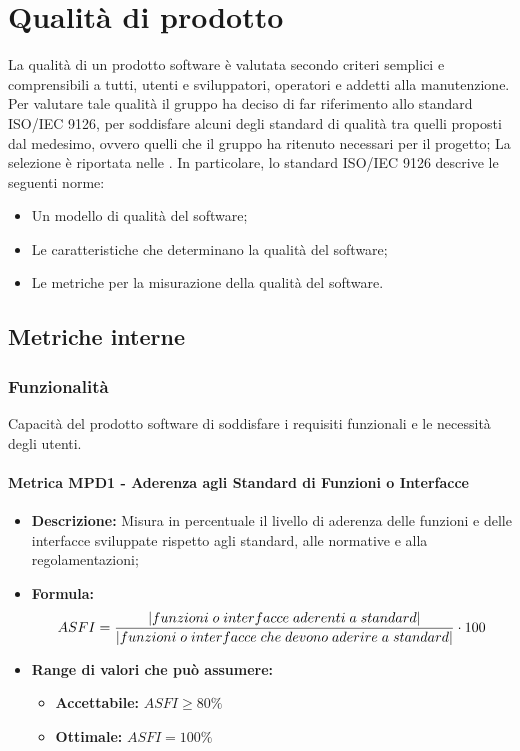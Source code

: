 \section{Qualità di prodotto}
La qualità di un prodotto software è valutata secondo criteri semplici e comprensibili a tutti, utenti e sviluppatori, operatori e addetti alla manutenzione.
Per valutare tale qualità il gruppo \Gruppo{} ha deciso di far riferimento allo standard ISO/IEC 9126, per soddisfare alcuni degli standard di qualità tra quelli proposti dal medesimo, ovvero quelli che il gruppo ha ritenuto necessari per il progetto; La selezione è riportata nelle \NdP{}. In particolare, lo standard ISO/IEC 9126 descrive le seguenti norme:
\begin{itemize}
    \item Un modello di qualità del software; 
    \item Le caratteristiche che determinano la qualità del software;
    \item Le metriche per la misurazione della qualità del software.
\end{itemize}

\subsection{Metriche interne}

\subsubsection{Funzionalità}
Capacità del prodotto software di soddisfare i requisiti funzionali e le necessità degli utenti.
\paragraph{Metrica MPD1 - Aderenza agli Standard di Funzioni o Interfacce} 
\begin{itemize}
    \item \textbf{Descrizione:} Misura in percentuale il livello di aderenza delle funzioni e delle interfacce sviluppate rispetto agli standard, alle normative e alla regolamentazioni;
    \item \textbf{Formula:} $$ASFI = {|funzioni \; o \; interfacce \; aderenti \; a \; standard| \over |funzioni \; o \; interfacce \; che \; devono \; aderire \; a \; standard|} \cdot 100 $$ 
    \item \textbf{Range di valori che può assumere:}
    \begin{itemize}
        \item \textbf{Accettabile:} $ASFI \geq 80\% $
        \item \textbf{Ottimale:} $ASFI = 100\%$
    \end{itemize}
\end{itemize}
              
